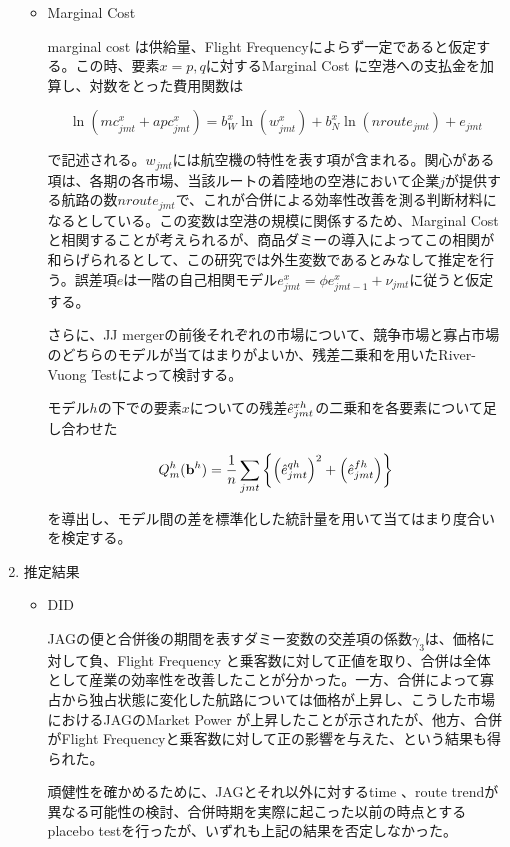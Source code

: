 \documentclass{jsarticle}
\begin{document}
\begin{enumerate}
\begin{itemize}
\item Marginal Cost

marginal cost は供給量、Flight Frequencyによらず一定であると仮定する。この時、要素$x=p,q$に対するMarginal Cost に空港への支払金を加算し、対数をとった費用関数は

\[ \ln(mc_{jmt}^x + apc_{jmt}^x) = b_W^x \ln (w_{jmt}^x) 
+ b_N^x \ln(\textit{nroute}_{jmt}) + e_{jmt} \]

で記述される。$w_{jmt}$には航空機の特性を表す項が含まれる。関心がある項は、各期の各市場、当該ルートの着陸地の空港において企業$j$が提供する航路の数$\textit{nroute}_{jmt}$で、これが合併による効率性改善を測る判断材料になるとしている。この変数は空港の規模に関係するため、Marginal Costと相関することが考えられるが、商品ダミーの導入によってこの相関が和らげられるとして、この研究では外生変数であるとみなして推定を行う。誤差項$e$は一階の自己相関モデル$e_{jmt}^x = \phi e_{jmt-1}^x + \nu_{jmt}$に従うと仮定する。

さらに、JJ mergerの前後それぞれの市場について、競争市場と寡占市場のどちらのモデルが当てはまりがよいか、残差二乗和を用いたRiver-Vuong Testによって検討する。

モデル$h$の下での要素$x$についての残差$\Hat{e}_{jmt}^{xh}$の二乗和を各要素について足し合わせた

\[Q_m^h(\mathbf{b}^h) = \dfrac{1}{n} \sum_{jmt} 
\left\{ \left( \Hat{e}_{jmt}^{qh}\right)^2 +\left( \Hat{e}_{jmt}^{fh} \right) \right\} \]

を導出し、モデル間の差を標準化した統計量を用いて当てはまり度合いを検定する。

\end{itemize}

\item 推定結果

 \begin{itemize}
 
 \item DID
 
 JAGの便と合併後の期間を表すダミー変数の交差項の係数$\gamma_3$は、価格に対して負、Flight Frequency と乗客数に対して正値を取り、合併は全体として産業の効率性を改善したことが分かった。一方、合併によって寡占から独占状態に変化した航路については価格が上昇し、こうした市場におけるJAGのMarket Power が上昇したことが示されたが、他方、合併がFlight Frequencyと乗客数に対して正の影響を与えた、という結果も得られた。
 
 頑健性を確かめるために、JAGとそれ以外に対するtime 、route trendが異なる可能性の検討、合併時期を実際に起こった以前の時点とするplacebo testを行ったが、いずれも上記の結果を否定しなかった。
 

\end{itemize}
\end{enumerate}
\end{document}
